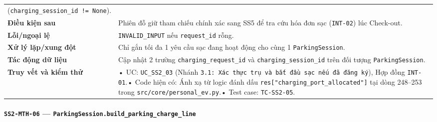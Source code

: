 \documentclass[11pt,a4paper]{article}
\begin{document}
\begin{longtable}[]{@{}
  >{\raggedright\arraybackslash}p{}
  >{\raggedright\arraybackslash}p{}@{}}
(\texttt{charging\_session\_id\ !=\ None}). \\
\textbf{Điều kiện sau} & Phiên đỗ giữ tham chiếu chính xác sang SS5 để
tra cứu hóa đơn sạc (\texttt{INT-02}) lúc Check-out. \\
\textbf{Lỗi/ngoại lệ} & \texttt{INVALID\_INPUT} nếu \texttt{request\_id}
rỗng. \\
\textbf{Xử lý lặp/xung đột} & Chỉ gắn tối đa 1 yêu cầu sạc đang hoạt
động cho cùng 1 \texttt{ParkingSession}. \\
\textbf{Tác động dữ liệu} & Cập nhật 2 trường
\texttt{charging\_request\_id} và \texttt{charging\_session\_id} trên
đối tượng \texttt{ParkingSession}. \\
\textbf{Truy vết và kiểm thử} & • UC: \texttt{UC\_SS2\_03} (Nhánh
\texttt{3.1:\ Xác\ thực\ trụ\ và\ bắt\ đầu\ sạc\ nếu\ đã\ đăng\ ký}),
Hợp đồng \texttt{INT-01}.• Code hiện có: Ánh xạ từ logic đánh dấu
\texttt{res{[}"charging\_port\_allocated"{]}} tại dòng 248--253 trong
\texttt{src/core/personal\_ev.py}.• Test case: \texttt{TC-SS2-05}. \\
\end{longtable}

\hypertarget{ss2-mth-06-parkingsession.build_parking_charge_line}{%
\paragraph{\texorpdfstring{\texttt{SS2-MTH-06} ---
\texttt{ParkingSession.build\_parking\_charge\_line}}{SS2-MTH-06 --- ParkingSession.build\_parking\_charge\_line}}\label{ss2-mth-06-parkingsession.build_parking_charge_line}}
\end{document}
